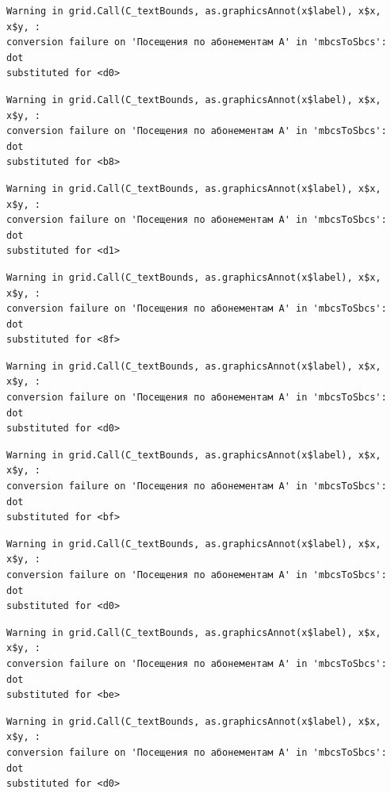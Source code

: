 \documentclass[
  letterpaper,
  DIV=11,
  numbers=noendperiod]{scrartcl}
\begin{document}
\begin{verbatim}
Warning in grid.Call(C_textBounds, as.graphicsAnnot(x$label), x$x, x$y, :
conversion failure on 'Посещения по абонементам А' in 'mbcsToSbcs': dot
substituted for <d0>
\end{verbatim}

\begin{verbatim}
Warning in grid.Call(C_textBounds, as.graphicsAnnot(x$label), x$x, x$y, :
conversion failure on 'Посещения по абонементам А' in 'mbcsToSbcs': dot
substituted for <b8>
\end{verbatim}

\begin{verbatim}
Warning in grid.Call(C_textBounds, as.graphicsAnnot(x$label), x$x, x$y, :
conversion failure on 'Посещения по абонементам А' in 'mbcsToSbcs': dot
substituted for <d1>
\end{verbatim}

\begin{verbatim}
Warning in grid.Call(C_textBounds, as.graphicsAnnot(x$label), x$x, x$y, :
conversion failure on 'Посещения по абонементам А' in 'mbcsToSbcs': dot
substituted for <8f>
\end{verbatim}

\begin{verbatim}
Warning in grid.Call(C_textBounds, as.graphicsAnnot(x$label), x$x, x$y, :
conversion failure on 'Посещения по абонементам А' in 'mbcsToSbcs': dot
substituted for <d0>
\end{verbatim}

\begin{verbatim}
Warning in grid.Call(C_textBounds, as.graphicsAnnot(x$label), x$x, x$y, :
conversion failure on 'Посещения по абонементам А' in 'mbcsToSbcs': dot
substituted for <bf>
\end{verbatim}

\begin{verbatim}
Warning in grid.Call(C_textBounds, as.graphicsAnnot(x$label), x$x, x$y, :
conversion failure on 'Посещения по абонементам А' in 'mbcsToSbcs': dot
substituted for <d0>
\end{verbatim}

\begin{verbatim}
Warning in grid.Call(C_textBounds, as.graphicsAnnot(x$label), x$x, x$y, :
conversion failure on 'Посещения по абонементам А' in 'mbcsToSbcs': dot
substituted for <be>
\end{verbatim}

\begin{verbatim}
Warning in grid.Call(C_textBounds, as.graphicsAnnot(x$label), x$x, x$y, :
conversion failure on 'Посещения по абонементам А' in 'mbcsToSbcs': dot
substituted for <d0>
\end{verbatim}
\end{document}
